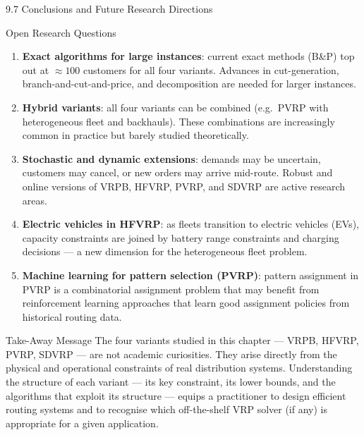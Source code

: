 \documentclass[aspectratio=169,10pt]{beamer}
\begin{document}
\begin{frame}[allowframebreaks]{9.7 Conclusions and Future Research Directions}
\begin{block}{Open Research Questions}
  \begin{enumerate}
    \item \textbf{Exact algorithms for large instances}: current exact methods
          (B\&P) top out at $\approx100$ customers for all four variants.
          Advances in cut-generation, branch-and-cut-and-price, and
          decomposition are needed for larger instances.
    \item \textbf{Hybrid variants}: all four variants can be combined (e.g.\
          PVRP with heterogeneous fleet and backhauls).  These combinations
          are increasingly common in practice but barely studied theoretically.
    \item \textbf{Stochastic and dynamic extensions}: demands may be uncertain,
          customers may cancel, or new orders may arrive mid-route.  Robust
          and online versions of VRPB, HFVRP, PVRP, and SDVRP are active
          research areas.
    \item \textbf{Electric vehicles in HFVRP}: as fleets transition to electric
          vehicles (EVs), capacity constraints are joined by battery range
          constraints and charging decisions --- a new dimension for the
          heterogeneous fleet problem.
    \item \textbf{Machine learning for pattern selection (PVRP)}: pattern
          assignment in PVRP is a combinatorial assignment problem that may
          benefit from reinforcement learning approaches that learn good
          assignment policies from historical routing data.
  \end{enumerate}
\end{block}

\framebreak

\begin{alertblock}{Take-Away Message}
  The four variants studied in this chapter --- VRPB, HFVRP, PVRP, SDVRP ---
  are not academic curiosities.  They arise directly from the physical and
  operational constraints of real distribution systems.  Understanding the
  structure of each variant --- its key constraint, its lower bounds, and the
  algorithms that exploit its structure --- equips a practitioner to design
  efficient routing systems and to recognise which off-the-shelf VRP solver
  (if any) is appropriate for a given application.
\end{alertblock}

\end{frame}
\end{document}
